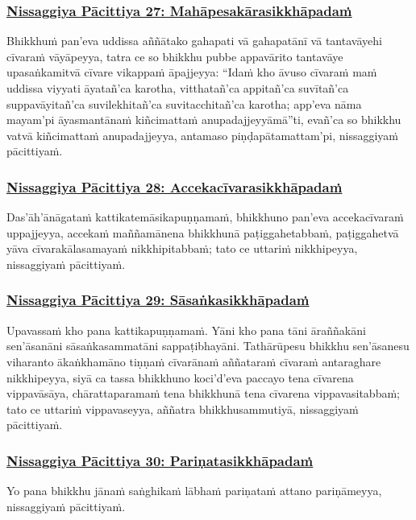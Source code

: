 \subsubsection*{\hyperref[forf-exp27]{Nissaggiya Pācittiya 27: Mahāpesakārasikkhāpadaṁ}}
\label{np27}
Bhikkhuṁ pan'eva uddissa aññātako gahapati vā gahapatānī vā tantavāyehi cīvaraṁ vāyāpeyya, tatra ce so bhikkhu pubbe appavārito tantavāye upasaṅkamitvā cīvare vikappaṁ āpajjeyya: ``Idaṁ kho āvuso cīvaraṁ maṁ uddissa viyyati āyatañ'ca karotha, vitthatañ'ca appitañ'ca suvītañ'ca suppavāyitañ'ca suvilekhitañ'ca suvitacchitañ'ca karotha; app'eva nāma mayam'pi āyasmantānaṁ kiñcimattaṁ anupadajjeyyāmā''ti, evañ'ca so bhikkhu vatvā kiñcimattaṁ anupadajjeyya, antamaso piṇḍapātamattam'pi, nissaggiyaṁ pācittiyaṁ.

\subsubsection*{\hyperref[forf-exp28]{Nissaggiya Pācittiya 28: Accekacīvarasikkhāpadaṁ}}
\label{np28}
Das'āh'ānāgataṁ kattikatemāsikapuṇṇamaṁ, bhikkhuno pan'eva accekacīvaraṁ uppajjeyya, accekaṁ maññamānena bhikkhunā paṭiggahetabbaṁ, paṭiggahetvā yāva cīvarakālasamayaṁ nikkhipitabbaṁ; tato ce uttariṁ nikkhipeyya, nissaggiyaṁ pācittiyaṁ.

\subsubsection*{\hyperref[forf-exp29]{Nissaggiya Pācittiya 29: Sāsaṅkasikkhāpadaṁ}}
\label{np29}
Upavassaṁ kho pana kattikapuṇṇamaṁ. Yāni kho pana tāni āraññakāni sen'āsanāni sāsaṅkasammatāni sappaṭibhayāni. Tathārūpesu bhikkhu sen'āsanesu viharanto ākaṅkhamāno tiṇṇaṁ cīvarānaṁ aññataraṁ cīvaraṁ antaraghare nikkhipeyya, siyā ca tassa bhikkhuno koci'd'eva paccayo tena cīvarena vippavāsāya, chārattaparamaṁ tena bhikkhunā tena cīvarena vippavasitabbaṁ; tato ce uttariṁ vippavaseyya, aññatra bhikkhusammutiyā, nissaggiyaṁ pācittiyaṁ.

\subsubsection*{\hyperref[forf-exp30]{Nissaggiya Pācittiya 30: Pariṇatasikkhāpadaṁ}}
\label{np30}
Yo pana bhikkhu jānaṁ saṅghikaṁ lābhaṁ pariṇataṁ attano pariṇāmeyya, nissaggiyaṁ pācittiyaṁ.

